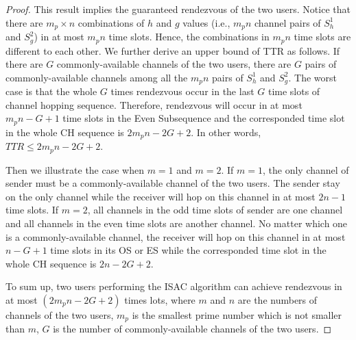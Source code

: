 \documentclass[journal]{IEEEtran}
\begin{document}
\begin{proof}
\par This result implies the guaranteed rendezvous of the two users. Notice that there are $m_p\times n$ combinations of $h$ and $g$ values (i.e., $m_pn$ channel pairs of $S_h^1$ and $S_g^2$) in at most $m_pn$ time slots. Hence, the combinations in $m_pn$ time slots are different to each other. We further derive an upper bound of TTR as follows. If there are $G$ commonly-available channels of the two users, there are $G$ pairs of commonly-available channels among all the $m_pn$ pairs of $S_h^1$ and $S_g^2$. The worst case is that the whole $G$ times rendezvous occur in the last $G$ time slots of channel hopping sequence. Therefore, rendezvous will occur in at most $m_pn-G+1$ time slots in the Even Subsequence and the corresponded time slot in the whole CH sequence is $2m_pn-2G+2$. In other words, $TTR\leq 2m_pn-2G+2$.
\par Then we illustrate the case when $m=1$ and $m=2$. If $m=1$, the only channel of sender must be a commonly-available channel of the two users. The sender stay on the only channel while the receiver will hop on this channel in at most $2n-1$ time slots. If $m=2$, all channels in the odd time slots of sender are one channel and all channels in the even time slots are another channel. No matter which one is a commonly-available channel, the receiver will hop on this channel in at most $n-G+1$ time slots in its OS or ES while the corresponded time slot in the whole CH sequence is $2n-2G+2$.
\par To sum up, two users performing the ISAC algorithm can achieve rendezvous in at most $(2m_pn-2G+2)$ times lots, where $m$ and $n$ are the numbers of channels of the two users, $m_p$ is the smallest prime number which is not smaller than $m$, $G$ is the number of commonly-available channels of the two users.
\end{proof}
\end{document}
